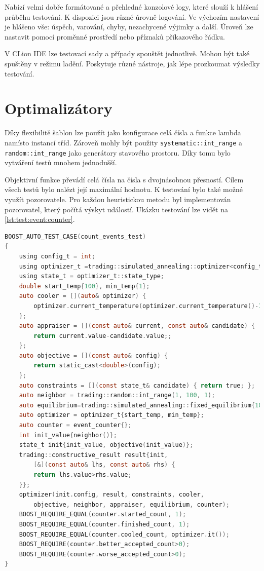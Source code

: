 Nabízí velmi dobře formátované a přehledné konzolové logy, které slouží k hlášení průběhu testování.
K dispozici jsou různé úrovně logování.
Ve výchozím nastavení je hlášeno vše: úspěch, varování, chyby, nezachycené výjimky a další.
Úroveň lze nastavit pomocí proměnné prostředí nebo příznaků příkazového řádku.

V CLion IDE lze testovací sady a případy spouštět jednotlivě.
Mohou být také spuštěny v režimu ladění.
Poskytuje různé nástroje, jak lépe prozkoumat výsledky testování.

\section{Optimalizátory}
Díky flexibilitě šablon lze použít jako konfigurace celá čísla a funkce lambda namísto instancí tříd.
Zároveň mohly být použity \texttt{systematic::int\_range} a \texttt{random::int\_range}  jako generátory stavového prostoru.
Díky tomu bylo vytváření testů mnohem jednodušší.

Objektivní funkce převádí celá čísla na čísla s dvojnásobnou přesností.
Cílem všech testů bylo nalézt její maximální hodnotu.
K testování bylo také možné využít pozorovatele.
Pro každou heuristickou metodu byl implementován pozorovatel, který počítá výskyt událostí.
Ukázku testování lze vidět na \ref{lst:test:event:counter}.

\begin{lstlisting}[caption={~Testování optimalizátoru pomocí pozorovatele},label={lst:test:event:counter},captionpos=t,abovecaptionskip=-\medskipamount,belowcaptionskip=\medskipamount,language=C]
BOOST_AUTO_TEST_CASE(count_events_test)
{
    using config_t = int;
    using optimizer_t =trading::simulated_annealing::optimizer<config_t>;
    using state_t = optimizer_t::state_type;
    double start_temp{100}, min_temp{1};
    auto cooler = [](auto& optimizer) {
        optimizer.current_temperature(optimizer.current_temperature()-1);
    };
    auto appraiser = [](const auto& current, const auto& candidate) {
        return current.value-candidate.value;;
    };
    auto objective = [](const auto& config) {
        return static_cast<double>(config);
    };
    auto constraints = [](const state_t& candidate) { return true; };
    auto neighbor = trading::random::int_range(1, 100, 1);
    auto equilibrium=trading::simulated_annealing::fixed_equilibrium{10};
    auto optimizer = optimizer_t{start_temp, min_temp};
    auto counter = event_counter{};
    int init_value{neighbor()};
    state_t init{init_value, objective(init_value)};
    trading::constructive_result result{init,
        [&](const auto& lhs, const auto& rhs) {
        return lhs.value>rhs.value;
    }};
    optimizer(init.config, result, constraints, cooler,
        objective, neighbor, appraiser, equilibrium, counter);
    BOOST_REQUIRE_EQUAL(counter.started_count, 1);
    BOOST_REQUIRE_EQUAL(counter.finished_count, 1);
    BOOST_REQUIRE_EQUAL(counter.cooled_count, optimizer.it());
    BOOST_REQUIRE(counter.better_accepted_count>0);
    BOOST_REQUIRE(counter.worse_accepted_count>0);
}
\end{lstlisting}


